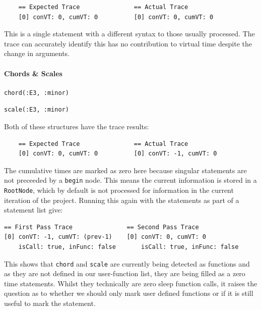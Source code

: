 \documentclass[11pt, abstracton, twoside, titlepage=true]{scrartcl}
\begin{document}
\begin{lstlisting}
    == Expected Trace               == Actual Trace
    [0] conVT: 0, cumVT: 0          [0] conVT: 0, cumVT: 0
\end{lstlisting}

This is a single statement with a different syntax to those usually processed. The 
trace can accurately identify this has no contribution to virtual time despite the 
change in arguments.

\paragraph{Chords \& Scales}
\begin{minipage}{\textwidth}
	\begin{lstlisting}[style = sonicpi]
      chord(:E3, :minor)
	\end{lstlisting}
\end{minipage}

\begin{minipage}{\textwidth}
	\begin{lstlisting}[style = sonicpi]
      scale(:E3, :minor)
	\end{lstlisting}
\end{minipage}

Both of these structures have the trace results:
\\
\begin{lstlisting}
    == Expected Trace               == Actual Trace
    [0] conVT: 0, cumVT: 0          [0] conVT: -1, cumVT: 0
\end{lstlisting}

The cumulative times are marked as zero here 
because singular statements are not preceeded by a \texttt{begin} node. This means 
the current information is stored in a \texttt{RootNode}, which by default is 
not processed for information in the current iteration of the project. Running this
again with the statements as part of a statement list give:
\\
\begin{lstlisting}
== First Pass Trace               == Second Pass Trace
[0] conVT: -1, cumVT: (prev-1)    [0] conVT: 0, cumVT: 0
    isCall: true, inFunc: false       isCall: true, inFunc: false
\end{lstlisting}

This shows that \texttt{chord} and \texttt{scale} are currently being detected 
as functions and as they are not defined in our user-function list, they are being 
filled as a zero time statements. Whilst they technically are zero sleep function 
calls, it raises the question as to whether we should only mark user defined 
functions or if it is still useful to mark the statement. 
\end{document}
